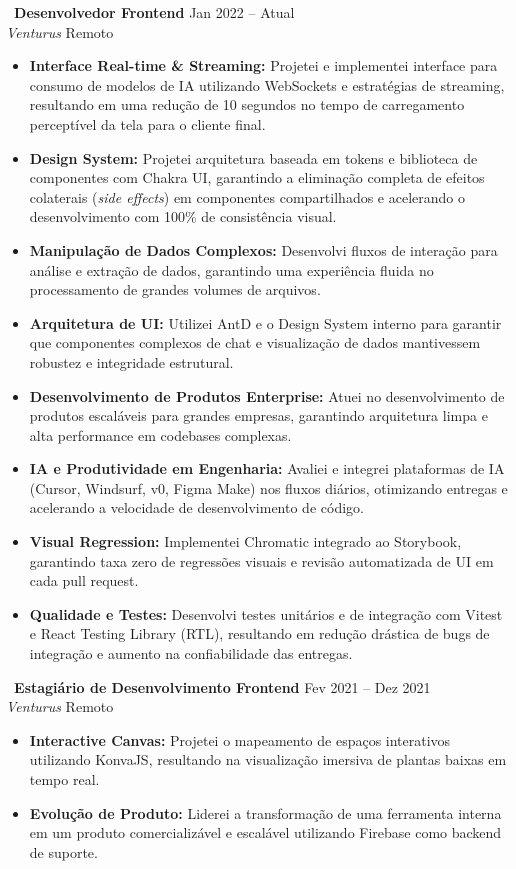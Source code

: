 \documentclass[10pt,a4paper]{article}
\begin{document}
\noindent\textbf{\textbullet~Desenvolvedor Frontend} \hfill Jan 2022 -- Atual \\
\textit{Venturus} \hfill Remoto
\begin{itemize}[leftmargin=*,label=\textendash,itemsep=2pt,parsep=0pt,topsep=2pt]
  \item \textbf{Interface Real-time \& Streaming:} Projetei e implementei interface para consumo de modelos de IA utilizando WebSockets e estratégias de streaming, resultando em uma redução de 10 segundos no tempo de carregamento perceptível da tela para o cliente final.
  \item \textbf{Design System:} Projetei arquitetura baseada em tokens e biblioteca de componentes com Chakra UI, garantindo a eliminação completa de efeitos colaterais (\textit{side effects}) em componentes compartilhados e acelerando o desenvolvimento com 100\% de consistência visual.
  \item \textbf{Manipulação de Dados Complexos:} Desenvolvi fluxos de interação para análise e extração de dados, garantindo uma experiência fluida no processamento de grandes volumes de arquivos.
  \item \textbf{Arquitetura de UI:} Utilizei AntD e o Design System interno para garantir que componentes complexos de chat e visualização de dados mantivessem robustez e integridade estrutural.
  \item \textbf{Desenvolvimento de Produtos Enterprise:} Atuei no desenvolvimento de produtos escaláveis para grandes empresas, garantindo arquitetura limpa e alta performance em codebases complexas.
  \item \textbf{IA e Produtividade em Engenharia:} Avaliei e integrei plataformas de IA (Cursor, Windsurf, v0, Figma Make) nos fluxos diários, otimizando entregas e acelerando a velocidade de desenvolvimento de código.
  \item \textbf{Visual Regression:} Implementei Chromatic integrado ao Storybook, garantindo taxa zero de regressões visuais e revisão automatizada de UI em cada pull request.
  \item \textbf{Qualidade e Testes:} Desenvolvi testes unitários e de integração com Vitest e React Testing Library (RTL), resultando em redução drástica de bugs de integração e aumento na confiabilidade das entregas.
\end{itemize}

\vspace{4pt}

\noindent\textbf{\textbullet~Estagiário de Desenvolvimento Frontend} \hfill Fev 2021 -- Dez 2021 \\
\textit{Venturus} \hfill Remoto
\begin{itemize}[leftmargin=*,label=\textendash,itemsep=2pt,parsep=0pt,topsep=2pt]
  \item \textbf{Interactive Canvas:} Projetei o mapeamento de espaços interativos utilizando KonvaJS, resultando na visualização imersiva de plantas baixas em tempo real.
  \item \textbf{Evolução de Produto:} Liderei a transformação de uma ferramenta interna em um produto comercializável e escalável utilizando Firebase como backend de suporte.
\end{itemize}
\end{document}
